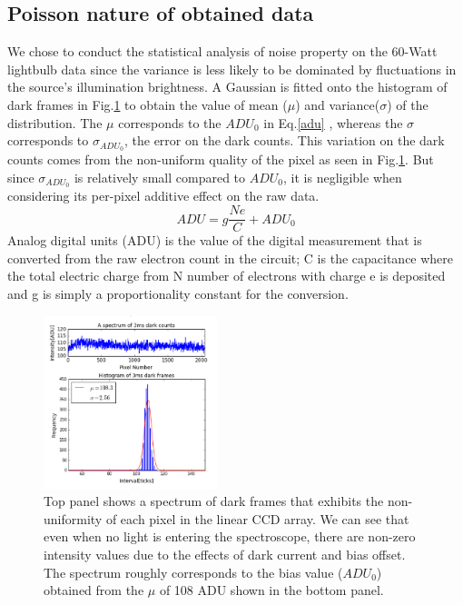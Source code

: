 \documentclass[authoryear, 12pt,5p, times]{elsarticle}
\begin{document}
 \subsection{Poisson nature of obtained data}
 We chose to conduct the statistical analysis of noise property on the 60-Watt lightbulb data since the variance is less likely to be dominated by fluctuations in the source's illumination brightness.
 A Gaussian is fitted onto the histogram of dark frames in Fig.\ref{dark&histo} to obtain the value of mean ($\mu$) and variance($\sigma$) of the distribution. The $\mu$ corresponds to the $ADU_0$ in Eq.\ref{adu} , whereas the $\sigma$ corresponds to $\sigma_{ADU_0}$, the error on the dark counts. This variation on the dark counts comes from the non-uniform quality of the pixel as seen in Fig.\ref{dark&histo}. But since $\sigma_{ADU_0}$ is relatively small compared to $ADU_0$, it is negligible when considering its per-pixel additive effect on the raw data.
 \begin{equation}\label{adu}
 ADU = g \frac{Ne}{C}+ADU_0
 \end{equation}
Analog digital units (ADU) is the value of the digital measurement that is converted from the raw electron count in the circuit; C is the capacitance where the total electric charge from N number of electrons with charge e is deposited and g is simply a proportionality constant for the conversion.
 \begin{figure}[h!]\includegraphics[width=0.45\textwidth]{figures/dark&biashisto}\caption{Top panel shows a spectrum of dark frames that exhibits the non-uniformity of each pixel in the linear CCD array. We can see that even when no light is entering the spectroscope, there are non-zero intensity values due to the effects of dark current and bias offset. The spectrum roughly corresponds to the bias value ($ADU_0$) obtained from the $\mu$ of 108 ADU shown in the bottom panel.}\label{dark&histo}\end{figure}
 
\end{document}
